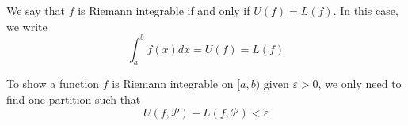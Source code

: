 \begin{definition}
    We say that $f$ is Riemann integrable if and only if $U(f)=L(f)$. In this case, we write $$\int_a^b f(x) d x=U(f)=L(f)$$
    
    \noindent To show a function $f$ is Riemann integrable on $[a, b)$ given $\varepsilon>0$, we only need to find one partition such that $$U(f, \mathcal{P})-L(f, \mathcal{P})<\varepsilon$$
\end{definition}